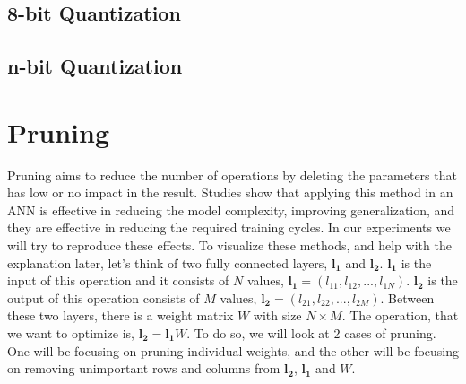 \subsection{8-bit Quantization}
\subsection{n-bit Quantization}
\section{Pruning}
Pruning aims to reduce the number of operations by deleting the parameters that has low or no impact in the result. Studies show that applying this method in an ANN is effective in reducing the model complexity, improving generalization, and they are effective in reducing the required training cycles. In our experiments we will try to reproduce these effects.
To visualize these methods, and help with the explanation later, let's think of two fully connected layers, $\mathbf{l_1}$ and $\mathbf{l_2}$. $\mathbf{l_1}$ is the input of this operation and it consists of $N$ values, $\mathbf{l_1}=(l_{11}, l_{12}, ..., l_{1N})$. $\mathbf{l_2}$ is the output of this operation consists of $M$ values, $\mathbf{l_2}=(l_{21}, l_{22}, ..., l_{2M})$. Between these two layers, there is a weight matrix $W$ with size $N \times M$. The operation, that we want to optimize is, $\mathbf{l_2} = \mathbf{l_1}W$. To do so, we will look at 2 cases of pruning. One will be focusing on pruning individual weights, and the other will be focusing on removing unimportant rows and columns from $\mathbf{l_2}$, $\mathbf{l_1}$ and $W$. 

